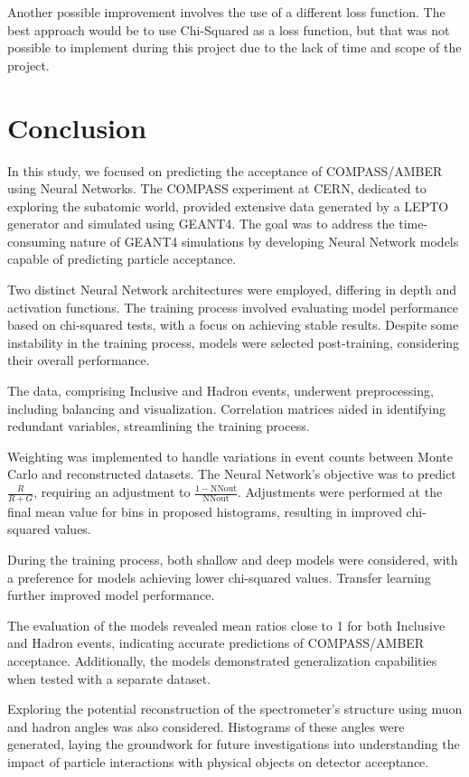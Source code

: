 \documentclass[EPJ,twocolumn]{webofc}
\begin{document}
Another possible improvement involves the use of a different loss function. The best approach would be to use Chi-Squared
as a loss function, but that was not possible to implement during this project due to the lack of time and scope of the project.



\section{Conclusion}
In this study, we focused on predicting the acceptance of COMPASS/AMBER using Neural Networks. The COMPASS experiment at CERN,
dedicated to exploring the subatomic world, provided extensive data generated by a LEPTO generator and simulated using GEANT4.
The goal was to address the time-consuming nature of GEANT4 simulations by developing Neural Network models capable of predicting
particle acceptance.

Two distinct Neural Network architectures were employed, differing in depth and activation functions. The training process involved
evaluating model performance based on chi-squared tests, with a focus on achieving stable results. Despite some instability in the
training process, models were selected post-training, considering their overall performance.

The data, comprising Inclusive and Hadron events, underwent preprocessing, including balancing and visualization. Correlation
matrices aided in identifying redundant variables, streamlining the training process.

Weighting was implemented to handle variations in event counts between Monte Carlo and reconstructed datasets. The Neural
Network's objective was to predict $\frac{R}{R+G}$, requiring an adjustment to $\frac{1 - \text{NN}{\text{out}}}{\text{NN}{\text{out}}}$.
Adjustments were performed at the final mean value for bins in proposed histograms, resulting in improved chi-squared values.

During the training process, both shallow and deep models were considered, with a preference for models achieving lower
chi-squared values. Transfer learning further improved model performance.

The evaluation of the models revealed mean ratios close to 1 for both Inclusive and Hadron events, indicating accurate
predictions of COMPASS/AMBER acceptance. Additionally, the models demonstrated generalization capabilities when tested with
a separate dataset.

Exploring the potential reconstruction of the spectrometer's structure using muon and hadron angles was also considered.
Histograms of these angles were generated, laying the groundwork for future investigations into understanding the impact of
particle interactions with physical objects on detector acceptance.
\end{document}
